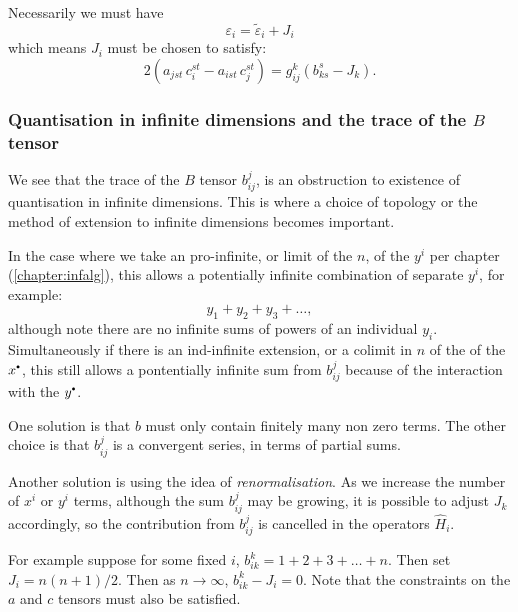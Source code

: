     Necessarily we must have
    \[ \varepsilon_i = \widetilde{\varepsilon}_i + J_i\]
    which means \(J_i\) must be chosen to satisfy:
    \[2 \left( a_{jst} \, c_i^{st} - a_{ist} \, c_j^{st} \right) = g_{ij}^k ( b_{k s }^{s} - J_k).\]
    
    \subsubsection{Quantisation in infinite dimensions and the trace of the \texorpdfstring{\(B\)}{B} tensor}
    
    We see that the trace of the \(B\) tensor \(b_{ij}^{j}\), is an obstruction to existence of quantisation in infinite dimensions. This is where a choice of topology or the method of extension to infinite dimensions becomes important.
    
    In the case where we take an pro-infinite, or limit of the \(n\), of the \(y^i\) per chapter (\ref{chapter:infalg}),
    this allows a potentially infinite combination of separate \(y^i\), for example:
    \[ y_1 + y_2 + y_3 + \dots, \]
    although note there are no infinite sums of powers of an individual \(y_i\). Simultaneously if there is an ind-infinite extension, or a colimit in \(n\) of the of the \(x^{\sbt}\), this still allows a pontentially infinite sum from \(b_{ij}^j\) because of the interaction with the \(y^{\sbt}\). 
    
    One solution is that \(b\) must only contain finitely many non zero terms. The other choice is that \(b_{ij}^j\) is a convergent series, in terms of partial sums. 
    
    Another solution is using the idea of  \emph{renormalisation}. As we increase the number of \(x^i\) or \(y^i\) terms, although the sum \(b_{ij}^{j}\) may be growing, it is possible to adjust \(J_k\) accordingly, so the contribution from \(b_{ij}^j \) is cancelled in the operators \(\widehat{H}_i\).
    
    \begin{ex}
    For example suppose for some fixed \(i\), \(b_{ik}^k = 1 + 2 + 3 + \dots + n \). Then set \(J_{i} = n(n+1)/2\). Then as \(n \rightarrow \infty\), \( b_{ik}^k - J_{i} = 0\). Note that the constraints on the \(a\) and \(c\) tensors must also be satisfied.
    \end{ex}
    
